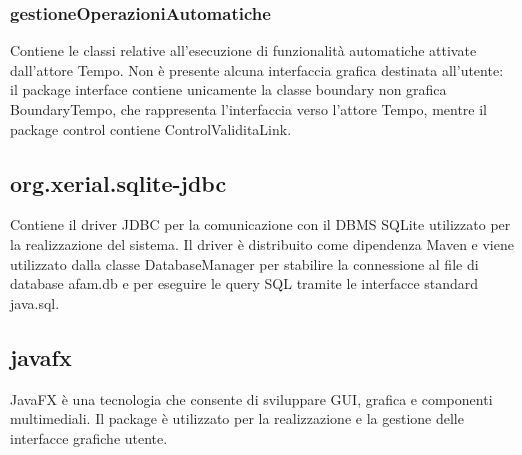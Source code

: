 \documentclass[12pt,a4paper]{article}
\begin{document}
\subsubsection{gestioneOperazioniAutomatiche}

Contiene le classi relative all'esecuzione di funzionalità automatiche attivate dall'attore Tempo. Non è presente alcuna interfaccia grafica destinata all'utente: il package interface contiene unicamente la classe boundary non grafica BoundaryTempo, che rappresenta l'interfaccia verso l'attore Tempo, mentre il package control contiene ControlValiditaLink.

\subsection{org.xerial.sqlite-jdbc}

Contiene il driver JDBC per la comunicazione con il DBMS SQLite utilizzato per la realizzazione del sistema. Il driver è distribuito come dipendenza Maven e viene utilizzato dalla classe DatabaseManager per stabilire la connessione al file di database afam.db e per eseguire le query SQL tramite le interfacce standard java.sql.

\subsection{javafx}

JavaFX è una tecnologia che consente di sviluppare GUI, grafica e componenti multimediali. Il package è utilizzato per la realizzazione e la gestione delle interfacce grafiche utente.
\end{document}
